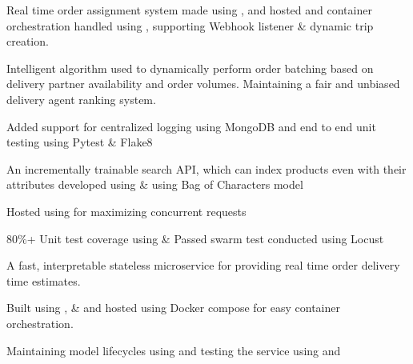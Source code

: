 \vspace{\topsep} %

\begin{tightemize}
\item Real time order assignment system made using ,  and hosted and container orchestration handled using , supporting Webhook listener \& dynamic trip creation.
\item Intelligent algorithm used to dynamically perform order batching based on delivery partner availability and order volumes. Maintaining a fair and unbiased delivery agent ranking system.
\item Added support for centralized logging using MongoDB and end to end unit testing using Pytest \& Flake8
\end{tightemize}

\begin{tightemize}
\item An incrementally trainable search API, which can index products even with their attributes developed using  \&  using Bag of Characters model
\item Hosted using  for maximizing concurrent requests
\item 80\%+ Unit test coverage using \& Passed swarm test conducted using Locust
\end{tightemize}

\begin{tightemize}
\item A fast, interpretable stateless microservice for providing real time order delivery time estimates.
\item Built using ,  \&  and hosted using Docker compose for easy container orchestration.
\item Maintaining model lifecycles using  and testing the service using  and 
\end{tightemize}